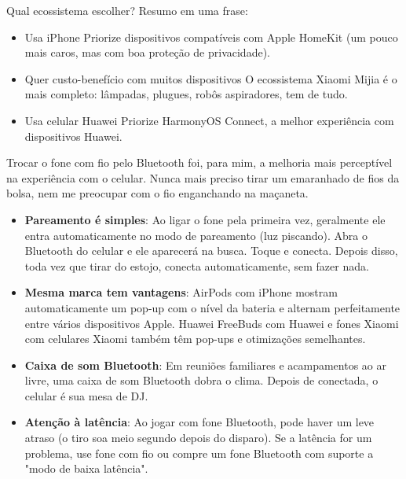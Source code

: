 Qual ecossistema escolher? Resumo em uma frase:

\begin{itemize}
  \item Usa iPhone Priorize dispositivos compatíveis com Apple HomeKit (um pouco mais caros, mas com boa proteção de privacidade).
  \item Quer custo-benefício com muitos dispositivos O ecossistema Xiaomi Mijia é o mais completo: lâmpadas, plugues, robôs aspiradores, tem de tudo.
  \item Usa celular Huawei Priorize HarmonyOS Connect, a melhor experiência com dispositivos Huawei.
\end{itemize}


Trocar o fone com fio pelo Bluetooth foi, para mim, a melhoria mais perceptível na experiência com o celular. Nunca mais preciso tirar um emaranhado de fios da bolsa, nem me preocupar com o fio enganchando na maçaneta.

\begin{itemize}
  \item \textbf{Pareamento é simples}: Ao ligar o fone pela primeira vez, geralmente ele entra automaticamente no modo de pareamento (luz piscando). Abra o Bluetooth do celular e ele aparecerá na busca. Toque e conecta. Depois disso, toda vez que tirar do estojo, conecta automaticamente, sem fazer nada.
  \item \textbf{Mesma marca tem vantagens}: AirPods com iPhone mostram automaticamente um pop-up com o nível da bateria e alternam perfeitamente entre vários dispositivos Apple. Huawei FreeBuds com Huawei e fones Xiaomi com celulares Xiaomi também têm pop-ups e otimizações semelhantes.
  \item \textbf{Caixa de som Bluetooth}: Em reuniões familiares e acampamentos ao ar livre, uma caixa de som Bluetooth dobra o clima. Depois de conectada, o celular é sua mesa de DJ.
  \item \textbf{Atenção à latência}: Ao jogar com fone Bluetooth, pode haver um leve atraso (o tiro soa meio segundo depois do disparo). Se a latência for um problema, use fone com fio ou compre um fone Bluetooth com suporte a "modo de baixa latência".
\end{itemize}

